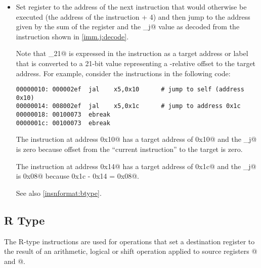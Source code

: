 \begin{itemize}
\item{}
\label{insn:jal}

Set register \verb@rd@ to the address of the next instruction that would 
otherwise be executed (the address of the \verb@jal@ instruction + 4) and then
jump to the address given by the sum of the \verb@pc@ register and the 
\verb@imm_j@ value as decoded from the instruction shown in 
\autoref{imm.j:decode}.

Note that \verb@pcrel_21@ is expressed in the instruction as a target address 
or label that is converted to a 21-bit value representing a \verb@pc@-relative 
offset to the target address. 
For example, consider the \verb@jal@ instructions in the following code:

\begin{verbatim}
00000010: 000002ef  jal    x5,0x10      # jump to self (address 0x10)
00000014: 008002ef  jal    x5,0x1c      # jump to address 0x1c
00000018: 00100073  ebreak    
0000001c: 00100073  ebreak    
\end{verbatim}

The instruction at address \verb@0x10@ has a target address of \verb@0x10@
and the \verb@imm_j@ is zero because offset from the ``current instruction''
to the target is zero.

The instruction at address \verb@0x14@ has a target address of \verb@0x1c@
and the \verb@imm_j@ is \verb@0x08@ because \verb@0x1c - 0x14 = 0x08@.

See also \autoref{insnformat:btype}.

\end{itemize}


\subsection{R Type}
\label{insnformat:rtype}

The R-type instructions are used for operations that set a destination 
register \verb@rd@ to the result of an arithmetic, logical or shift operation
applied to source registers @ and @.

